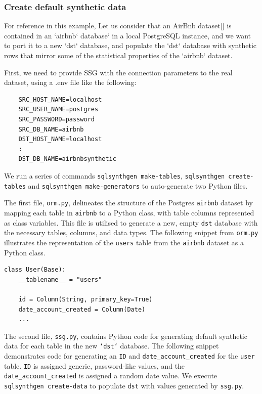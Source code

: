 \documentclass[11pt]{article}
\begin{document}
\subsubsection{Create default synthetic data}

For reference in this example, Let us consider that an AirBnb dataset[] is contained in an `airbnb` database` in a local PostgreSQL instance, and we want to port it to a new `dst` database, and populate the `dst` database with synthetic rows that mirror some of the statistical properties of the `airbnb` dataset.

First, we need to provide SSG with the connection parameters to the real dataset, using a .env file like the following:

\begin{verbatim}
    SRC_HOST_NAME=localhost 
    SRC_USER_NAME=postgres 
    SRC_PASSWORD=password
    SRC_DB_NAME=airbnb 
    DST_HOST_NAME=localhost 
    :
    DST_DB_NAME=airbnbsynthetic
\end{verbatim}

We run a series of commands \texttt{sqlsynthgen make-tables}, \texttt{sqlsynthgen create-tables} and \texttt{sqlsynthgen make-generators} to auto-generate two Python files. 

The first file, \texttt{orm.py}, delineates the structure of the Postgres \texttt{airbnb} dataset by mapping each table in \texttt{airbnb} to a Python class, with table columns represented as class variables. This file is utilised to generate a new, empty \texttt{dst} database with the necessary tables, columns, and data types. The following snippet from \texttt{orm.py} illustrates the representation of the \texttt{users} table from the \texttt{airbnb}  dataset as a Python class.


\begin{verbatim}
class User(Base):
    __tablename__ = "users"

    id = Column(String, primary_key=True)
    date_account_created = Column(Date)
    ...
\end{verbatim}

The second file, \texttt{ssg.py}, contains Python code for generating default synthetic data for each table in the new \texttt{`dst`} database. The following snippet demonstrates code for generating an \texttt{ID} and \texttt{date\_account\_created} for the \texttt{user} table. \texttt{ID} is assigned generic, password-like values, and the \texttt{date\_account\_created} is assigned a random date value. We execute \texttt{sqlsynthgen create-data} to populate \texttt{dst} with values generated by \texttt{ssg.py}.
\end{document}
